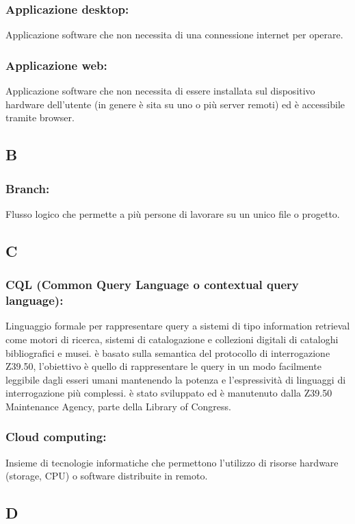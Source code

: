 \subsubsection*{Applicazione desktop:} Applicazione software che non necessita
di una connessione internet per operare.

\subsubsection*{Applicazione web:} Applicazione software che non necessita di
essere installata sul dispositivo hardware dell'utente (in genere \`e sita su uno o pi\`u server
remoti) ed \`e accessibile tramite browser.

\subsection*{\huge{B}}
\subsubsection*{Branch:}  Flusso logico che permette a pi\`u persone di lavorare
su un unico file o progetto.
\subsection*{\huge{C}}
\subsubsection*{CQL (Common Query Language o contextual query language):}
Linguaggio formale per rappresentare query a sistemi di tipo information
retrieval come motori di ricerca, sistemi di catalogazione e collezioni digitali di cataloghi
bibliografici e musei. \`e basato sulla semantica del protocollo di interrogazione
Z39.50, l'obiettivo \`e quello di rappresentare le query in un modo facilmente
leggibile dagli esseri umani mantenendo la potenza e l'espressivit\`a di linguaggi
di interrogazione pi\`u complessi. \`e stato sviluppato ed \`e manutenuto dalla Z39.50
Maintenance Agency, parte della Library of Congress.

\subsubsection*{Cloud computing:} Insieme di tecnologie informatiche che
permettono l'utilizzo di risorse hardware (storage, CPU) o software distribuite in remoto.

\subsection*{\huge{D}}
